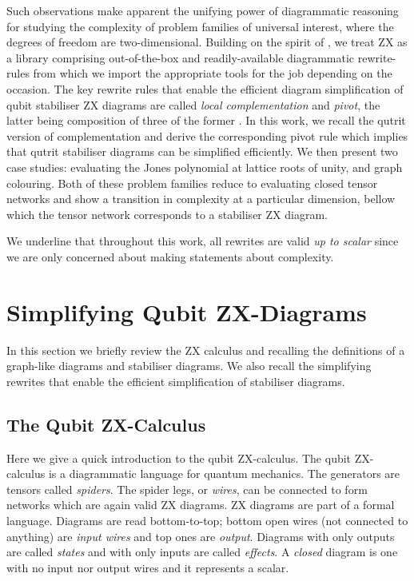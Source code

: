 \documentclass[submission,copyright,creativecommons]{eptcs}
\begin{document}
Such observations make apparent the unifying power of diagrammatic reasoning
for studying the complexity of problem families of universal interest,
where the degrees of freedom are two-dimensional.
Building on the spirit of \cite{debeaudrap2020tensor}, we treat ZX as a library comprising out-of-the-box and readily-available diagrammatic rewrite-rules from which we import the appropriate tools for the job depending on the occasion.
The key rewrite rules that enable the efficient diagram simplification
of qubit stabiliser ZX diagrams
are called \emph{local complementation} and \emph{pivot},
the latter being composition of three of the former \cite{graph_theoretic_simplification}.
In this work, we recall the qutrit version of complementation and derive the corresponding pivot rule
which implies that qutrit stabiliser diagrams can be simplified efficiently.
We then present two case studies: evaluating the Jones polynomial at lattice roots of unity, and graph colouring.
Both of these problem families reduce to evaluating
closed tensor networks and show a transition in complexity
at a particular dimension, bellow which the tensor network corresponds to a stabiliser ZX diagram.

We underline that throughout this work, all rewrites are valid
\emph{up to scalar}
since we are only concerned about making statements about complexity.

%  

\section{Simplifying Qubit ZX-Diagrams}

In this section we briefly review the ZX calculus
and recalling the definitions of a graph-like diagrams and stabiliser diagrams.
We also recall the simplifying rewrites that enable the efficient
simplification of stabiliser diagrams.

\subsection{The Qubit ZX-Calculus}

Here we give a quick introduction to the qubit ZX-calculus.
The qubit ZX-calculus is a diagrammatic language for quantum mechanics.
The generators are tensors called \textit{spiders}.
The spider legs, or \emph{wires}, can be connected to form networks which are again valid ZX diagrams.
ZX diagrams are part of a formal language. Diagrams are read bottom-to-top; bottom open wires (not connected to anything) are \emph{input wires} and top ones are \emph{output}.
Diagrams with only outputs are called \emph{states} and with only inputs are called \emph{effects}.
A \emph{closed} diagram is one with no input nor output wires
and it represents a scalar.
\end{document}
